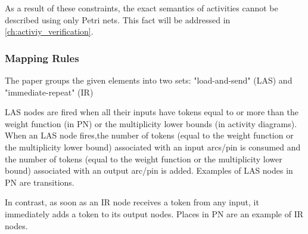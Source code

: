 As a result of these constraints, the exact semantics of activities cannot be described using only Petri nets. This fact will be addressed in \autoref{ch:activiy_verification}.

\subsubsection*{Mapping Rules}

The paper groups the given elements into two sets: "load-and-send" (LAS) and "immediate-repeat" (IR)

LAS nodes are fired when all their inputs have tokens equal to or more than the weight function (in PN) or the multiplicity lower bounds (in activity diagrams). When an LAS node fires,the number of tokens (equal to the weight function or the multiplicity lower bound) associated with an input arcs/pin is consumed and the number of tokens (equal to the weight function or the multiplicity lower bound) associated with an output arc/pin is added. Examples of LAS nodes in PN are transitions.

In contrast, as soon as an IR node receives a token from any input, it immediately adds a token to its output nodes. Places in PN are an example of IR nodes.
